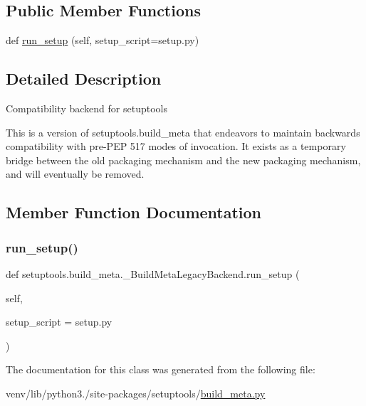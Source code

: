 \subsection*{Public Member Functions}
\begin{DoxyCompactItemize}
\item 
def \hyperlink{classsetuptools_1_1build__meta_1_1__BuildMetaLegacyBackend_ac8173cf8710f0f54706b4769efe93ca8}{run\+\_\+setup} (self, setup\+\_\+script=\textquotesingle{}setup.\+py\textquotesingle{})
\end{DoxyCompactItemize}


\subsection{Detailed Description}
\begin{DoxyVerb}Compatibility backend for setuptools

This is a version of setuptools.build_meta that endeavors
to maintain backwards
compatibility with pre-PEP 517 modes of invocation. It
exists as a temporary
bridge between the old packaging mechanism and the new
packaging mechanism,
and will eventually be removed.
\end{DoxyVerb}
 

\subsection{Member Function Documentation}
\mbox{\label{classsetuptools_1_1build__meta_1_1__BuildMetaLegacyBackend_ac8173cf8710f0f54706b4769efe93ca8}} 
\subsubsection{\texorpdfstring{run\+\_\+setup()}{run\_setup()}}
{\footnotesize\ttfamily def setuptools.\+build\+\_\+meta.\+\_\+\+Build\+Meta\+Legacy\+Backend.\+run\+\_\+setup (\begin{DoxyParamCaption}\item[{}]{self,  }\item[{}]{setup\+\_\+script = {\ttfamily \textquotesingle{}setup.py\textquotesingle{}} }\end{DoxyParamCaption})}



The documentation for this class was generated from the following file\+:\begin{DoxyCompactItemize}
\item 
venv/lib/python3./site-\/packages/setuptools/\hyperlink{build__meta_8py}{build\+\_\+meta.\+py}\end{DoxyCompactItemize}

